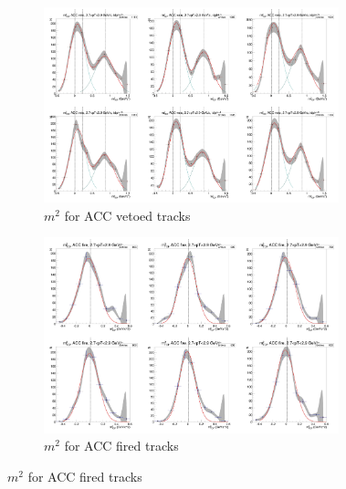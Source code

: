 \begin{figure}[H]
  \ContinuedFloat
    \begin{subfigure}{1\textwidth}
   \centering
   \includegraphics[width=0.94\textwidth]{hiptfits/neg/PSm2_cent0_ich0_accfire0_ptbin11.jpg}
    \caption{$m^2$ for ACC vetoed tracks}
    \end{subfigure}
    \begin{subfigure}{1\textwidth}
   \centering
   \includegraphics[width=0.94\textwidth]{hiptfits/neg/PSm2_cent0_ich0_accfire1_ptbin11.jpg}
    \caption{$m^2$ for ACC fired tracks}
    \end{subfigure}  
\end{figure}
